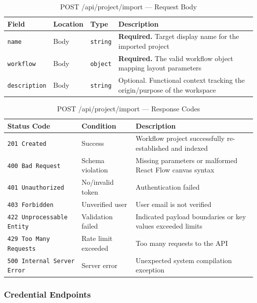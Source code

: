\begin{table}[H]
\centering
\renewcommand{\arraystretch}{1.3}
\begin{tabularx}{\textwidth}{|l|l|l|X|}
\hline
\textbf{Field} & \textbf{Location} & \textbf{Type} & \textbf{Description} \\
\hline
\texttt{name}        & Body              & \texttt{string} & \textbf{Required.} Target display name for the imported project \\
\hline
\texttt{workflow}    & Body              & \texttt{object} & \textbf{Required.} The valid workflow object mapping layout parameters \\
\hline
\texttt{description} & Body              & \texttt{string} & Optional. Functional context tracking the origin/purpose of the workspace \\
\hline
\end{tabularx}
\caption{POST /api/project/import — Request Body}
\label{tab:import-workflow-body}
\end{table}

\begin{table}[H]
\centering
\renewcommand{\arraystretch}{1.3}
\begin{tabularx}{\textwidth}{|l|l|X|}
\hline
\textbf{Status Code} & \textbf{Condition} & \textbf{Description} \\
\hline
\texttt{201 Created}      & Success            & Workflow project successfully re-established and indexed \\
\hline
\texttt{400 Bad Request}  & Schema violation   & Missing parameters or malformed React Flow canvas syntax \\
\hline
\texttt{401 Unauthorized} & No/invalid token   & Authentication failed \\
\hline
\texttt{403 Forbidden}    & Unverified user    & User email is not verified \\
\hline
\texttt{422 Unprocessable Entity} & Validation failed & Indicated payload boundaries or key values exceeded limits \\
\hline
\texttt{429 Too Many Requests} & Rate limit exceeded & Too many requests to the API \\
\hline
\texttt{500 Internal Server Error} & Server error & Unexpected system compilation exception \\
\hline
\end{tabularx}
\caption{POST /api/project/import — Response Codes}
\label{tab:import-workflow-responses}
\end{table}
\FloatBarrier
\subsubsection{Credential Endpoints}
\label{subsec:credential-endpoints}

